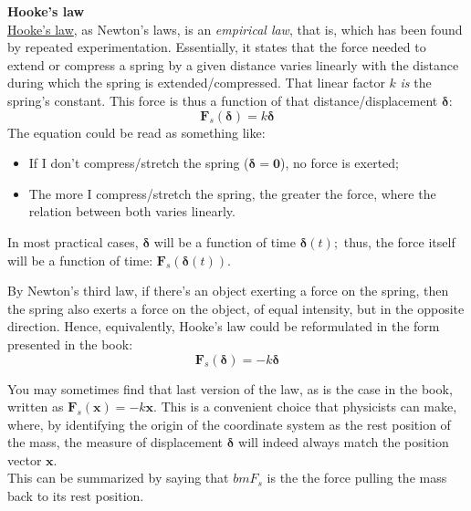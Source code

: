 \documentclass[solutions.tex]{subfiles}
\renewcommand{\bm}[1]{\pmb{#1}}
\begin{document}
\hr
\textbf{Hooke's law} \\
\href{https://en.wikipedia.org/wiki/Hooke\%27s\_law}{Hooke's law},
as Newton's laws, is an \textit{empirical law}, that is, which has been found
by repeated experimentation. Essentially, it states that the force needed to
extend or compress a spring by a given distance varies linearly with the
distance during which the spring is extended/compressed. That linear factor
$k$ \textit{is} the spring's constant. This force is thus a function
of that distance/displacement $\bm{\delta}$:
\[
	\bm{F}_s(\bm{\delta}) = k \bm{\delta}
\]
The equation could be read as something like:
\begin{itemize}
	\item If I don't compress/stretch the spring ($\bm{\delta}=\bm{0}$),
	no force is exerted;
	\item The more I compress/stretch the spring, the greater the force,
	where the relation between both varies linearly.
\end{itemize}

\begin{remark} In most practical cases, $\bm{\delta}$ will be a
function of time $\bm{\delta}(t)$; thus, the force itself will
be a function of time: $\bm{F}_s(\bm{\delta}(t))$.
\end{remark}

\begin{remark} By Newton's third law, if there's an object
exerting a force on the spring, then the spring also exerts a force
on the object, of equal intensity, but in the opposite direction. Hence,
equivalently, Hooke's law could be reformulated in the form presented
in the book:
\[
	\bm{F}_s(\bm{\delta}) = - k \bm{\delta}
\]
\end{remark}

\begin{remark}\label{rem:L03E04:origin} You may sometimes find that last
version of the law, as is the case in the book, written as
$\bm{F}_s(\bm{x}) = -k\bm{x}$.
This is a convenient choice that physicists can make, where, by
identifying the origin of the coordinate system as the rest position
of the mass, the measure of displacement $\bm{\delta}$ will indeed
always match the position vector $\bm{x}$. \\

This can be summarized by saying that $bm{F}_s$ is the the force pulling
the mass back to its rest position. \\
\end{remark}
\end{document}
